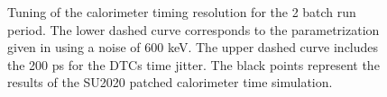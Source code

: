 \begin{figure}[h]
  \caption{
    \label{fig:calorimeter_timing_resolution_2batch}
    Tuning of the calorimeter timing resolution for the 2 batch run period.
    The lower dashed curve corresponds to the parametrization
    given in \cite{MU2E_36225_CALO_TIME_RES} using a noise of 600 keV.
    The upper dashed curve includes the 200 ps for the DTCs time jitter.
    The black points represent the results of the SU2020 patched calorimeter time simulation. 
  }
\end{figure}
